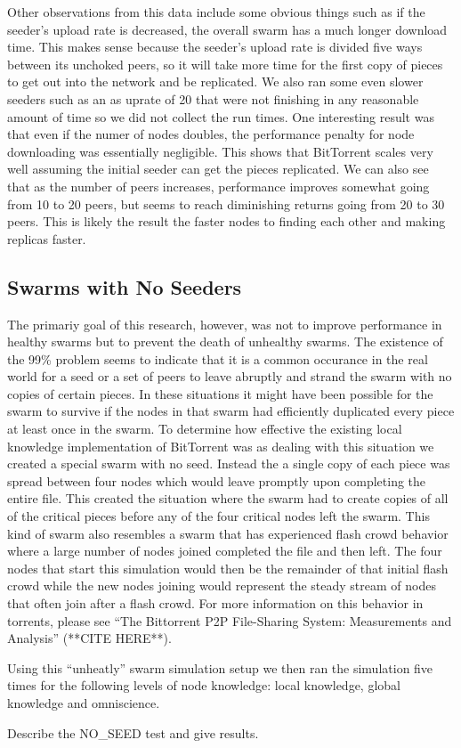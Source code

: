 Other observations from this data include some obvious things such as
if the seeder's upload rate is decreased, the overall swarm has a much
longer download time. This makes sense because the seeder's upload rate
is divided five ways between its unchoked peers, so it will take more
time for the first copy of pieces to get out into the network and be
replicated. We also ran some even slower seeders such as an as uprate
of 20 that were not finishing in any reasonable amount of time so we
did not collect the run times. One interesting result was that even if
the numer of nodes doubles, the performance penalty for node downloading
was essentially negligible. This shows that BitTorrent scales very well
assuming the initial seeder can get the pieces replicated.  We can also
see that as the number of peers increases, performance improves somewhat
going from 10 to 20 peers, but seems to reach diminishing returns going
from 20 to 30 peers. This is likely the result the faster nodes to
finding each other and making replicas faster.



\subsection{Swarms with No Seeders}

The primariy goal of this research, however, was not to improve performance in
healthy swarms but to prevent the death of unhealthy swarms. The existence of the
99\% problem seems to indicate that it is a common occurance in the real world for
a seed or a set of peers to leave abruptly and strand the swarm with no copies of certain
pieces. In these situations it might have been possible for the swarm to survive if the nodes
in that swarm had efficiently duplicated every piece at least once in the swarm. To determine
how effective the existing local knowledge implementation of BitTorrent was as dealing with
this situation we created a special swarm with no seed. Instead the a single copy of each piece
was spread between four nodes which would leave promptly upon completing the entire file. This
created the situation where the swarm had to create copies of all of the critical pieces 
before any of the four critical nodes left the swarm. This kind of swarm also resembles a
swarm that has experienced flash crowd behavior where a large number of nodes joined completed
the file and then left. The four nodes that start this simulation would then be the remainder of
that initial flash crowd while the new nodes joining would represent the steady stream of nodes
that often join after a flash crowd. For more information on this behavior in torrents, please
see ``The Bittorrent P2P File-Sharing System: Measurements and Analysis'' (**CITE HERE**). 

Using this ``unheatly'' swarm simulation setup we then ran the simulation five times for the 
following levels of node knowledge: local knowledge, global knowledge and omniscience. 


Describe the NO\_SEED test and give results.
